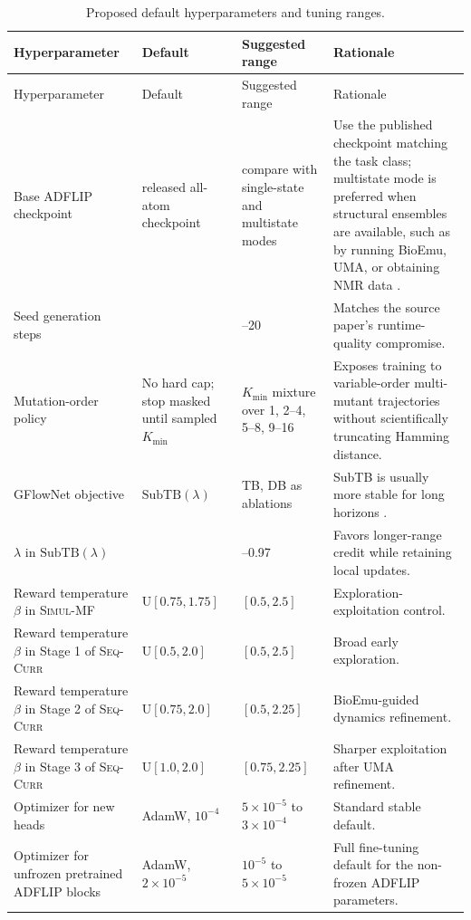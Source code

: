 \documentclass[11pt]{article}
\newcommand{\SubTB}{\ensuremath{\mathrm{SubTB}}}
\newcommand{\methodI}{\textsc{Simul-MF}}
\newcommand{\methodII}{\textsc{Seq-Curr}}
\begin{document}
\begin{longtable}{>{\raggedright\arraybackslash}p{} >{\raggedright\arraybackslash}p{} >{\raggedright\arraybackslash}p{} >{\raggedright\arraybackslash}p{}}
\caption{Proposed default hyperparameters and tuning ranges.}\label{tab:hyper}\\
\toprule
Hyperparameter & Default & Suggested range & Rationale \\
\midrule
\endfirsthead
\toprule
Hyperparameter & Default & Suggested range & Rationale \\
\midrule
\endhead
Base ADFLIP checkpoint & released all-atom checkpoint & compare with single-state and multistate modes & Use the published checkpoint matching the task class; multistate mode is preferred when structural ensembles are available, such as by running BioEmu, UMA, or obtaining NMR data \citep{yi2025adflip}. \\
Seed generation steps & 10 & 5--20 & Matches the source paper's runtime-quality compromise. \\
Mutation-order policy & No hard cap; stop masked until sampled $K_{\min}$ & $K_{\min}$ mixture over 1, 2--4, 5--8, 9--16 & Exposes training to variable-order multi-mutant trajectories without scientifically truncating Hamming distance. \\
GFlowNet objective & $\SubTB(\lambda)$ & TB, DB as ablations & SubTB is usually more stable for long horizons \citep{madan2023subtb}. \\
$\lambda$ in $\SubTB(\lambda)$ & 0.9 & 0.7--0.97 & Favors longer-range credit while retaining local updates. \\
Reward temperature $\beta$ in \methodI{} & $\mathrm U[0.75,1.75]$ & $[0.5,2.5]$ & Exploration-exploitation control. \\
Reward temperature $\beta$ in Stage 1 of \methodII{} & $\mathrm U[0.5,2.0]$ & $[0.5,2.5]$ & Broad early exploration. \\
Reward temperature $\beta$ in Stage 2 of \methodII{} & $\mathrm U[0.75,2.0]$ & $[0.5,2.25]$ & BioEmu-guided dynamics refinement. \\
Reward temperature $\beta$ in Stage 3 of \methodII{} & $\mathrm U[1.0,2.0]$ & $[0.75,2.25]$ & Sharper exploitation after UMA refinement. \\
Optimizer for new heads & AdamW, $10^{-4}$ & $5\times10^{-5}$ to $3\times10^{-4}$ & Standard stable default. \\
Optimizer for unfrozen pretrained ADFLIP blocks & AdamW, $2\times10^{-5}$ & $10^{-5}$ to $5\times10^{-5}$ & Full fine-tuning default for the non-frozen ADFLIP parameters. \\

\end{longtable}
\end{document}
